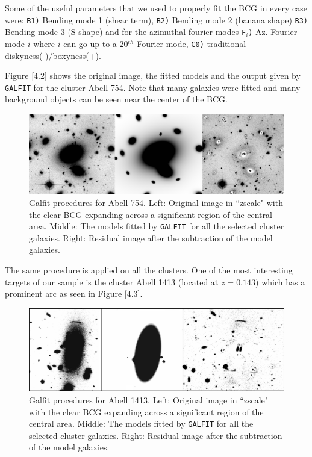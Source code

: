 Some of the useful parameters that we used to properly fit the BCG in every case were: \texttt{B1)} Bending mode 1 (shear term), \texttt{B2)} Bending mode 2 (banana shape)
\texttt{B3)} Bending mode 3 (S-shape) and for the azimuthal fourier modes
\texttt{F$_i$)} Az. Fourier mode $i$ where $i$ can go up to a 20$^{th}$ Fourier mode, \texttt{C0)}   traditional diskyness(-)/boxyness(+).

Figure [4.2] shows the original image, the fitted models and the output given by \texttt{GALFIT} for the cluster Abell 754. Note that many galaxies were fitted and many background objects can be seen near the center of the BCG. 

\begin{figure}[H]
\centering
\includegraphics[width=15cm]{images/galfit.png}
\caption[Galfit results for Abell 754]{Galfit procedures for Abell 754. Left: Original image in ``zscale" with the clear BCG expanding across a significant region of the central area. Middle: The models fitted by \texttt{GALFIT} for all the selected cluster galaxies. Right: Residual image after the subtraction of the model galaxies.}
\end{figure}

The same procedure is applied on all the clusters. One of the most interesting targets of our sample is the cluster Abell 1413 (located at $z=0.143$) which has a prominent arc as seen in Figure [4.3]. 

\begin{figure}[H]
\centering
\includegraphics[width=15cm]{images/A1413.png}
\caption[Galfit results for Abell 1413]{Galfit procedures for  Abell 1413. Left: Original image in ``zscale" with the clear BCG expanding across a significant region of the central area. Middle: The models fitted by \texttt{GALFIT} for all the selected cluster galaxies. Right: Residual image after the subtraction of the model galaxies.}
\end{figure}

